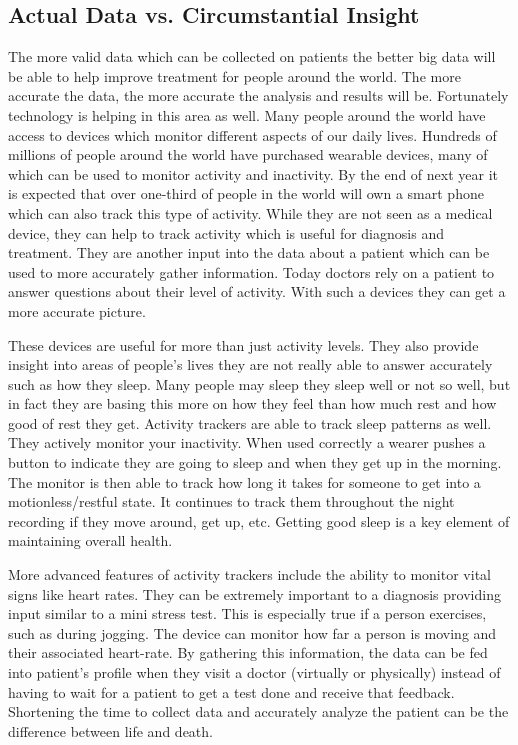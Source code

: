 \documentclass[sigconf]{acmart}
\begin{document}
\subsection{Actual Data vs. Circumstantial Insight}
The more valid data which can be collected on patients the better big 
data will be able to help improve treatment for people around the world.  
The more accurate the data, the more accurate the analysis and results 
will be.  Fortunately technology is helping in this area as well.  
Many people around the world have access to devices which monitor 
different aspects of our daily lives.  Hundreds of millions of people 
around the world have purchased wearable devices, many of which can be 
used to monitor activity and inactivity\cite{StatistaWearable}.  By the 
end of next year it is expected that over one-third of people in the 
world will own a smart phone which can also track this type of 
activity\cite{StatistaPhones}.  While they are not seen as a medical 
device, they can help to track activity which is useful for diagnosis 
and treatment.  They are another input into the data about a patient 
which can be used to more accurately gather information.  Today doctors 
rely on a patient to answer questions about their level of activity.  
With such a devices they can get a more accurate picture.  

These devices are useful for more than just activity levels.  They 
also provide insight into areas of people's lives they are not really 
able to answer accurately such as how they sleep.  Many people may 
sleep they sleep well or not so well, but in fact they are basing this 
more on how they feel than how much rest and how good of rest they 
get.  Activity trackers are able to track sleep patterns as well.  They 
actively monitor your inactivity.  When used correctly a wearer pushes 
a button to indicate they are going to sleep and when they get up in 
the morning.  The monitor is then able to track how long it takes for 
someone to get into a motionless/restful state.  It continues to 
track them throughout the night recording if they move around, get up, 
etc.  Getting good sleep is a key element of maintaining overall 
health\cite{Health}.

More advanced features of activity trackers include the ability to 
monitor vital signs like heart rates.  They can be extremely important 
to a diagnosis providing input similar to a mini stress test.  This 
is especially true if a person exercises, such as during jogging.  The 
device can monitor how far a person is moving and their associated 
heart-rate.  By gathering this information, the data can be fed into 
patient's profile when they visit a doctor (virtually or physically) 
instead of having to wait for a patient to get a test done and receive 
that feedback.  Shortening the time to collect data and accurately 
analyze the patient can be the difference between life and death.
\end{document}
